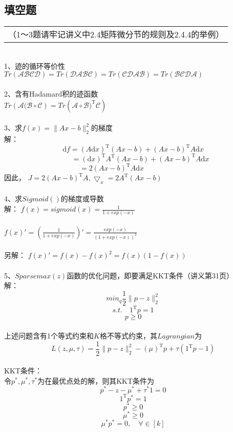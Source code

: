 \documentclass[UFT8]{ctexart}
\begin{document}
\subsection{填空题}
\begin{tabular}{@{} l @{}}
\hline
（1～3题请牢记讲义中2.4矩阵微分节的规则及2.4.4的举例）
\end{tabular}
~\\
1、迹的循环等价性\\
$Tr(\mathcal{ABCD}) = Tr(\mathcal{DABC}) = Tr(\mathcal{CDAB}) = Tr(\mathcal{BCDA})$\\
~\\
2、含有Hadamard积的迹函数 \\
$Tr(\mathcal{A(B\circ C}) = Tr(\mathcal{A\circ B)^\mathrm{T}C})$
~\\
~\\
3、求$f(x) = \big\|Ax - b\|_{2} ^{2}$的梯度\\
解：
\begin{displaymath}
\mathrm{d}f = (A\mathrm{d} x)^\mathrm{T}(Ax - b) + (Ax - b)^\mathrm{T}A\mathrm{d} x  
\end{displaymath}
\begin{displaymath}
 \quad \quad = (\mathrm{d}x)^\mathrm{T}A^\mathrm{T}(Ax - b) + (Ax - b)^\mathrm{T}A\mathrm{d}x 
\end{displaymath}
\begin{displaymath}
 =  2(Ax - b)^\mathrm{T}A\mathrm{d}x \quad \qquad \quad  \quad \quad 
 \end{displaymath}
 因此，
 $ J = 2(Ax - b)^\mathrm{T}A, \bigtriangledown_{x} = 2A^\mathrm{T}(Ax - b)$
 ~\\
 ~\\
 4、求$Sigmoid()$的梯度或导数 \\
 解：
 $ f(x) = sigmoid(x)  = \frac{1}{1 + exp(-x)}$\\
 ~\\
 $f(x)' = (\frac{1}{1 + exp(-x)})' =\frac{exp(-x)}{(1 + exp(-x))^{2}} $\\
 ~\\
 另解：
 $f(x)' = f(x) - f(x)^{2} = f(x)(1 - f(x)) $
 ~\\
 ~\\
 5、$Sparsemax(z)$函数的优化问题，即要满足KKT条件（讲义第31页）\\
 解：
 \[ min_{q} \frac{1}{2} \big\|p - z\|_{2}^{2} \]  
 \[s.t. \quad 1^\mathrm{T}p = 1 \] 
 \[ p \geq 0 \] 
 ~\\
 上述问题含有1个等式约束和$K$格不等式约束，其$Lagrangian$为\\
 \[ L(z,\mu,\tau) = \frac{1}{2}\big\|p -z\|_{2}^{2} - (\mu)^\mathrm{T}p + \tau(1^\mathrm{T}p -1) \]
 ~\\
 KKT条件：\\
 令$p^{*},\mu^{*},\tau^{*}$为在最优点处的解，则其KKT条件为 \\
 \[ p^{*} - z - \mu^{*} + \tau^{*}1 = 0 \]
 \[ 1^\mathrm{T}p^{*} = 1 \]
\[ p^{*} \geq 0 \]
\[ \mu^{*} \geq 0 \]
\[ \mu^{*}p^{*} = 0, \quad \forall \in [k] \]
~\\
\end{document}
